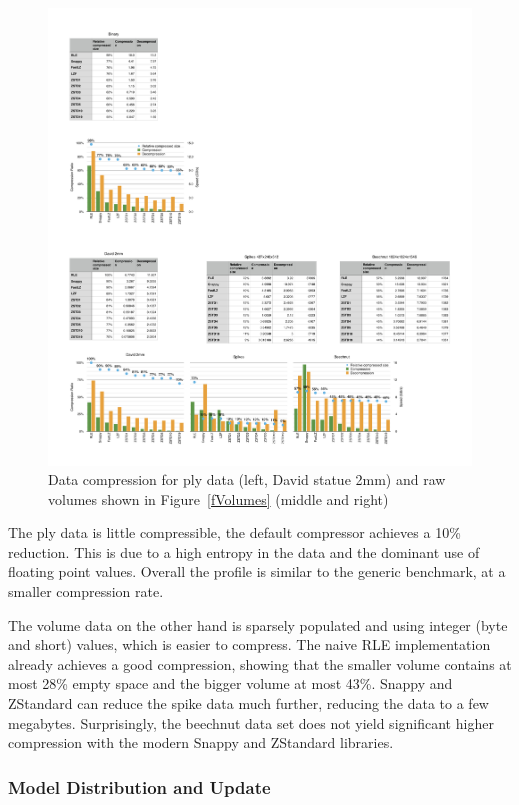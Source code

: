 \documentclass[10pt,journal,compsoc]{IEEEtran}
\newcommand{\fig}[1]{Figure~\ref{#1}}
\begin{document}
\begin{figure}[ht]\center
  \includegraphics[width=\textwidth]{images/compressorDetail}
  \caption{\label{fCompressorDetail}Data compression for ply data (left, David
    statue 2mm) and raw volumes shown in \fig{fVolumes} (middle and right)}
\end{figure}

The ply data is little compressible, the default compressor achieves a 10\%
reduction. This is due to a high entropy in the data and the dominant use of
floating point values. Overall the profile is similar to the generic benchmark,
at a smaller compression rate.

The volume data on the other hand is sparsely populated and using integer (byte
and short) values, which is easier to compress. The naive RLE implementation
already achieves a good compression, showing that the smaller volume contains at
most 28\% empty space and the bigger volume at most 43\%. Snappy and ZStandard
can reduce the spike data much further, reducing the data to a few megabytes.
Surprisingly, the beechnut data set does not yield significant higher
compression with the modern Snappy and ZStandard libraries.


\subsubsection{Model Distribution and Update}
\end{document}
